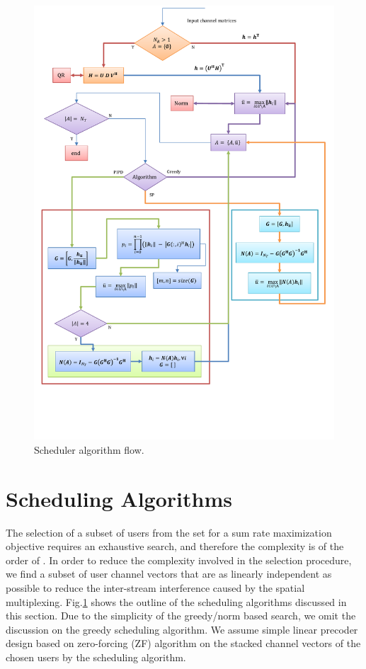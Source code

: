 \documentclass[conference,letterpaper]{./../../IEEE/IEEEtran}
\begin{document}
\begin{figure}
	\centering
	\includegraphics[trim=0in 1.5in 0in 0.75in,width=\columnwidth, angle=0]{Algorithm_Model}
	\caption{Scheduler algorithm flow.}
	\label{kuva:scheduler_block_diag}
	\vspace{-0.1in}
\end{figure}

\section{Scheduling Algorithms}
\label{sec:sched_discussions}
The selection of a subset of users  from the set  for a sum rate maximization objective requires an exhaustive search, and therefore the complexity is of the order of . In order to reduce the complexity involved in the selection procedure, we find a subset of user channel vectors that are as linearly independent as possible to reduce the inter-stream interference caused by the spatial multiplexing. Fig.\ref{kuva:scheduler_block_diag} shows the outline of the scheduling algorithms discussed in this section. Due to the simplicity of the greedy/norm based search, we omit the discussion on the greedy scheduling algorithm. We assume simple linear precoder design based on zero-forcing (ZF) algorithm on the stacked channel vectors of the chosen users by the scheduling algorithm.
\end{document}

